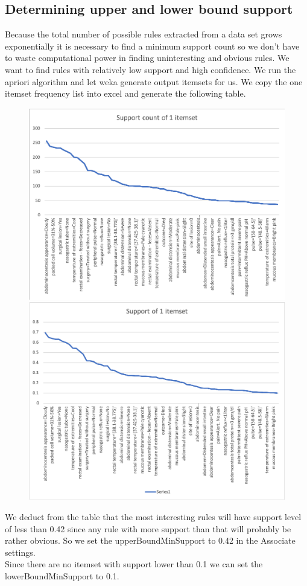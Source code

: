\subsection{Determining upper and lower bound support}

Because the total number of possible rules extracted
from a data set grows exponentially it is necessary to find a minimum support count so we don't have to waste computational power in finding uninteresting and obvious rules.
We want to find rules with relatively low support and high confidence.
We run the apriori algorithm and let weka generate output itemsets for us.  We copy the one itemset frequency list into excel and generate the following table.


\begin{figure}[H]
\includegraphics[scale=0.7]{SupportCountTable.png}

\includegraphics[scale=0.7]{SupportTable.png}
\end{figure}

We deduct from the table that the most interesting rules will have support level of less than 0.42 since any rule with more support than that will probably be rather obvious. So we set the upperBoundMinSupport to 0.42 in the Associate settings.\\
Since there are no itemset with support lower than 0.1 we can set the lowerBoundMinSupport to 0.1.